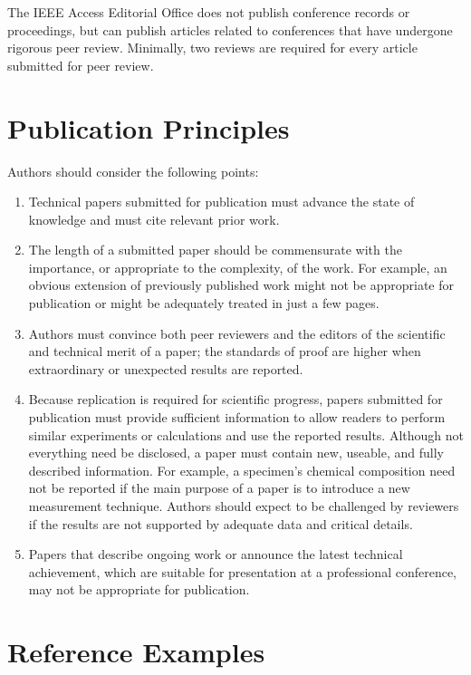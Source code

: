 \documentclass{ieeeaccess}
\begin{document}
The IEEE Access Editorial Office does not publish conference
records or proceedings, but can publish articles related to conferences that
have undergone rigorous peer review. Minimally, two reviews are required for
every article submitted for peer review.

\section{\break Publication Principles}
Authors should consider the following points:

\begin{enumerate}
\item Technical papers submitted for publication must advance the state of knowledge and must cite relevant prior work.
\item The length of a submitted paper should be commensurate with the importance, or appropriate to the complexity, of the work. For example, an obvious extension of previously published work might not be appropriate for publication or might be adequately treated in just a few pages.
\item Authors must convince both peer reviewers and the editors of the scientific and technical merit of a paper; the standards of proof are higher when extraordinary or unexpected results are reported.
\item Because replication is required for scientific progress, papers submitted for publication must provide sufficient information to allow readers to perform similar experiments or calculations and
use the reported results. Although not everything need be disclosed, a paper
must contain new, useable, and fully described information. For example, a
specimen's chemical composition need not be reported if the main purpose of
a paper is to introduce a new measurement technique. Authors should expect
to be challenged by reviewers if the results are not supported by adequate
data and critical details.
\item Papers that describe ongoing work or announce the latest technical achievement, which are suitable for presentation at a professional conference, may not be appropriate for publication.
\end{enumerate}



\section{\break Reference Examples}
\end{document}
